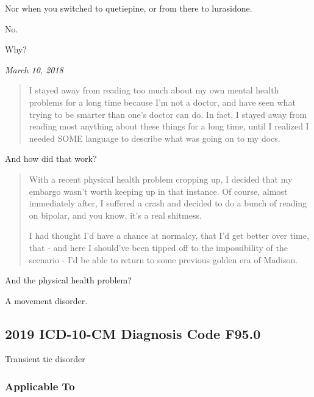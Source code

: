 \begin{paracol}{2}
\begin{leftcolumn}
\begin{ally}
Nor when you switched to quetiepine, or from there to lurasidone.
\end{ally}
No.

\begin{ally}
Why?
\end{ally}
\end{leftcolumn}
\begin{rightcolumn*}
  \emph{March 10, 2018}
\end{rightcolumn*}
\begin{leftcolumn}
\begin{quotation}
  \noindent I stayed away from reading too much about my own mental health problems for a long time because I'm not a doctor, and have seen what trying to be smarter than one's doctor can do. In fact, I stayed away from reading most anything about these things for a long time, until I realized I needed SOME language to describe what was going on to my docs.
\end{quotation}

\begin{ally}
And how did that work?
\end{ally}

\begin{quotation}
  \noindent With a recent physical health problem cropping up, I decided that my embargo wasn't worth keeping up in that instance. Of course, almost immediately after, I suffered a crash and decided to do a bunch of reading on bipolar, and you know, it's a real shitmess.

  I had thought I'd have a chance at normalcy, that I'd get better over time, that - and here I should've been tipped off to the impossibility of the scenario - I'd be able to return to some previous golden era of Madison.
\end{quotation}

\begin{ally}
And the physical health problem?
\end{ally}
A movement disorder.
\newpage

\hypertarget{icd-10-cm-diagnosis-code-f95.0}{%
\subsection{2019 ICD-10-CM Diagnosis Code F95.0}\label{icd-10-cm-diagnosis-code-f95.0}}

Transient tic disorder

\hypertarget{applicable-to}{%
\subsubsection{Applicable To}\label{applicable-to}}


\end{leftcolumn}
\end{paracol}
